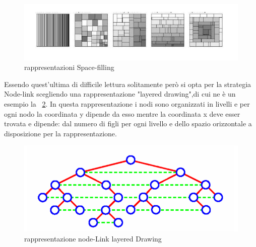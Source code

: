 {\begin{figure}[!htb]
	\begin{center}
		\includegraphics[width=0.9 \linewidth]{figure/spaceFilling}
	\end{center}
	\caption{rappresentazioni Space-filling\label{fig:spaceFilling}}
\end{figure}
\newline
Essendo quest'ultima di difficile lettura solitamente però si opta per la strategia Node-link scegliendo una rappresentazione "layered drawing",di cui ne è un esempio la \figurename~\ref{fig:layered}. In questa rappresentazione i nodi sono organizzati in livelli e per ogni nodo la coordinata y dipende da esso mentre la coordinata x deve esser trovata e dipende: dal numero di figli per ogni livello e dello spazio orizzontale a disposizione per la rappresentazione.
\begin{figure}[!htb]
	\begin{center}
		\includegraphics[width=0.9 \linewidth]{figure/layered}
	\end{center}
	\caption{rappresentazione node-Link layered Drawing\label{fig:layered}}
\end{figure}

}
